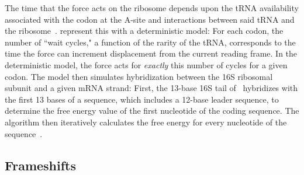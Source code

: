 \documentclass{article}
\begin{document}
The time that the force acts on the ribosome depends upon
the tRNA availability associated with the codon at the A-site 
and interactions between said tRNA and the ribosome~\cite{phelps}.
\citeauthor{lalit:mechanics} represent this with a deterministic model: For each codon,
the number of ``wait cycles," a function of the rarity of the
tRNA, corresponds to the time the force can
increment displacement from the current reading frame.  In the
deterministic model, the force acts for \emph{exactly} this number
of cycles for a given codon. The model then
simulates hybridization between the
16S ribosomal subunit and a given mRNA strand: First, the 13-base 16S
tail of \ecoli\ hybridizes with the first 13 bases of a sequence,
which includes a 12-base leader sequence, to determine the free energy 
value of the first nucleotide of the coding sequence. The algorithm then iteratively calculates
the free energy for every nucleotide of the sequence~\cite{starmer}.

\subsection{Frameshifts}
\label{section:frameshifts}
\end{document}
